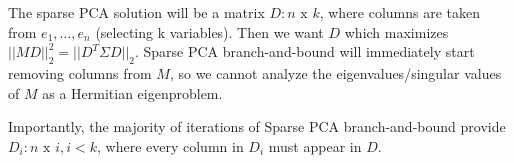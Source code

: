 \documentclass{article}
\begin{document}
The sparse PCA solution will be a matrix $D : n\text{ x }k$, where columns are taken from $e_1,\dots,e_n$ (selecting k variables). Then we want $D$ which maximizes $||MD||_2^2 = ||D^T \Sigma D||_2$. Sparse PCA branch-and-bound will immediately start removing columns from $M$, so we cannot analyze the eigenvalues/singular values of $M$ as a Hermitian eigenproblem.

Importantly, the majority of iterations of Sparse PCA branch-and-bound provide $D_i : n\text{ x }i, i < k$, where every column in $D_i$ must appear in $D$.




\end{document}
